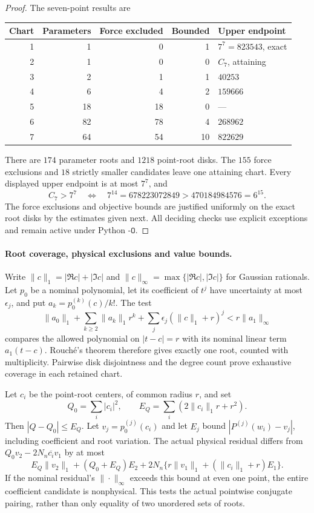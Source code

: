 \begin{proof}
The seven-point results are
\begin{center}
\begin{tabular}{rrrrl}
\toprule
Chart&Parameters&Force excluded&Bounded&Upper endpoint\\
\midrule
1&1&0&1&$7^7=823543$, exact\\
2&1&0&0&$C_7$, attaining\\
3&2&1&1&$40253$\\
4&6&4&2&$159666$\\
5&18&18&0&---\\
6&82&78&4&$268962$\\
7&64&54&10&$822629$\\
\bottomrule
\end{tabular}
\end{center}
There are $174$ parameter roots and $1218$ point-root disks.
The $155$ force exclusions and $18$ strictly smaller candidates leave
one attaining chart. Every displayed upper endpoint is at most $7^7$,
and
\[
 C_7>7^7\quad\Longleftrightarrow\quad
 7^{14}=678223072849>470184984576=6^{15}.
\]
The force exclusions and objective bounds are justified uniformly on
the exact root disks by the estimates given next. All deciding checks
use explicit exceptions and remain active under Python $\texttt{-O}$.
\end{proof}

\paragraph{Root coverage, physical exclusions and value bounds.}
Write $\|c\|_1=|\Re c|+|\Im c|$ and
$\|c\|_\infty=\max\{|\Re c|,|\Im c|\}$ for Gaussian rationals.
Let $p_0$ be a nominal polynomial, let its coefficient of $t^j$ have
uncertainty at most $\epsilon_j$, and put
$a_k=p_0^{(k)}(c)/k!$. The test
\[
 \|a_0\|_1+\sum_{k\ge2}\|a_k\|_1r^k
       +\sum_j\epsilon_j(\|c\|_1+r)^j
 <r\|a_1\|_\infty
\]
compares the allowed polynomial on $|t-c|=r$ with its nominal
linear term $a_1(t-c)$. Rouch\'e's theorem therefore gives exactly
one root, counted with multiplicity. Pairwise disk disjointness and
the degree count prove exhaustive coverage in each retained chart.

Let $c_i$ be the point-root centers, of common radius $r$, and set
\[
 Q_0=\sum_i|c_i|^2,\qquad
 E_Q=\sum_i(2\|c_i\|_1r+r^2).
\]
Then $|Q-Q_0|\le E_Q$. Let $v_j=p_0^{(j)}(c_i)$ and let $E_j$
bound $|P^{(j)}(w_i)-v_j|$, including coefficient and root variation.
The actual physical residual differs from
$Q_0v_2-2N_n\overline{c_i}v_1$ by at most
\[
 E_Q\|v_2\|_1+(Q_0+E_Q)E_2
 +2N_n\{r\|v_1\|_1+(\|c_i\|_1+r)E_1\}.
\]
If the nominal residual's $\|\cdot\|_\infty$ exceeds this bound
at even one point, the entire coefficient candidate is nonphysical.
This tests the actual pointwise conjugate pairing, rather than only
equality of two unordered sets of roots.

